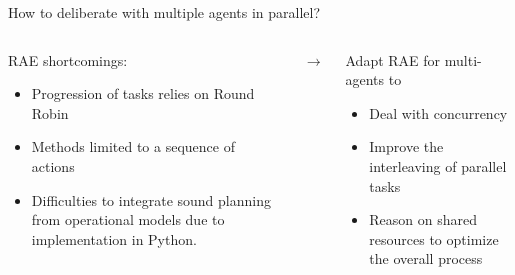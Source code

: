 \begin{frame}{How to deliberate with multiple agents in parallel?}
    \begin{columns}
        \begin{column}{0.45\textwidth}
            RAE shortcomings:
            \begin{itemize}
                \item Progression of tasks relies on Round Robin
                \item Methods limited to a sequence of actions
                \item Difficulties to integrate sound planning from operational models due to implementation in Python.
            \end{itemize}
        \end{column}
        $\rightarrow$
        \pause
        \begin{column}{0.45\textwidth}
            Adapt RAE for multi-agents to
            \begin{itemize}
                \item Deal with concurrency
                \item Improve the interleaving of parallel tasks
                \item Reason on shared resources to optimize the overall process
            \end{itemize}
        \end{column}
    \end{columns}
\end{frame}